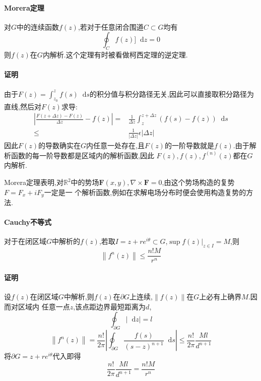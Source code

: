 \documentclass[UTF8]{ctexart}
\newcommand{\dif}{\mathop{}\!\mathrm{d}}
\begin{document}
\paragraph{Morera定理}
对$G$中的连续函数$f(z)$,若对于任意闭合围道$C \subset  G$均有
\begin{equation}
  \oint_{C}^{}f(z)]\dif z=0
\end{equation}
则$f(z)$在$G$内解析.这个定理有时被看做柯西定理的逆定理.

\paragraph{证明}
由于$F(z)=\int_{z_{0}}^{z}f(s)\dif s$的积分值与积分路径无关,因此可以直接取积分路径为直线,然后对$F(z)$求导:
\begin{equation}
  \begin{aligned}
    \left| \frac{F(z+\Delta z)-F(z)}{\Delta z}-f(z) \right|=&\frac{1}{\Delta z}\int_{z}^{z+\Delta z}(f(s)-f(z))\dif s \\
    \leqslant&\frac{1}{\left| \Delta z \right| }\epsilon \left| \Delta z \right|
  \end{aligned}
\end{equation}
因此$F(z)$的导数确实在$G$内任意一处存在,且$F(z)$的一阶导数就是$f(z)$.由于解析函数的每一阶导数都是区域内的解析函数,因此
$F(z),f(z),f^{(n)}(z)$都在$G$内解析.

Morera定理表明,对$\mathbb{R}^{2}$中的势场$\mathbf{F}(x,y),\nabla \times \mathbf{F}=0$,由这个势场构造的复势$F=F_{x}+iF_{y}$一定是一
个解析函数,例如在求解电场分布时便会使用构造复势的方法.

\paragraph{Cauchy不等式}
对于在闭区域$G$中解析的$f(z)$,若取$I=z+re^{i\theta}\subset G$,$\sup f(z)|_{z\in I}=M$,则
\begin{equation}
  \left\| f^{n}(z) \right\|\leqslant\frac{n!M}{r^{n}}
\end{equation}

\paragraph{证明}
设$f(z)$在闭区域$G$中解析,则$f(z)$在$\partial G$上连续,$\left\| f(z) \right\|$在$G$上必有上确界$M$.因而对区域内
任意一点$z$,该点距边界最短距离为$d$,
\begin{equation}
  \oint_{\partial G}^{}\left| \dif z \right|=l
\end{equation}
\begin{equation}
  \left\| f^{n}(z) \right\|=\frac{n!}{2\pi}\left| \oint_{\partial G}^{} \frac{f(s)}{(s-z)^{n+1}}\dif s \right|
  \leqslant\frac{n!}{2\pi}\frac{Ml}{d^{n+1}}
\end{equation}
将$\partial G=z+re^{i\theta}$代入即得
\begin{equation}
  \frac{n!}{2\pi}\frac{Ml}{d^{n+1}}=\frac{n!M}{r^{n}}
\end{equation}
\end{document}
